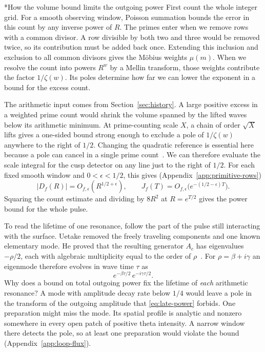 \documentclass[11pt,letterpaper]{article}
\makeatletter
\renewcommand\subsection{\@startsection{subsection}{2}{\z@}{-2.0ex plus -.3ex}{.75ex}{\normalfont\normalsize\itshape}}
\numberwithin{equation}{section}
\makeatother
\begin{document}
\subsection*{How the volume bound limits the outgoing power}
First count the whole integer grid. For a smooth observing window, Poisson summation bounds the error in this count by any inverse power of $R$. The primes enter when we remove rows with a common divisor. A row divisible by both two and three would be removed twice, so its contribution must be added back once. Extending this inclusion and exclusion to all common divisors gives the M\"obius weights $\mu(m)$. When we resolve the count into powers $R^w$ by a Mellin transform, those weights contribute the factor $1/\zeta(w)$. Its poles determine how far we can lower the exponent in a bound for the excess count.

The arithmetic input comes from Section~\ref{sec:history}. A large positive excess in a weighted prime count would shrink the volume spanned by the lifted waves below its arithmetic minimum. At prime-counting scale $X$, a chain of order $\sqrt X$ lifts gives a one-sided bound strong enough to exclude a pole of $1/\zeta(w)$ anywhere to the right of $1/2$. Changing the quadratic reference is essential here because a pole can cancel in a single prime count~\cite{volumelean,twistlean}. We can therefore evaluate the scale integral for the cusp detector on any line just to the right of $1/2$. For each fixed smooth window and $0<\epsilon<1/2$, this gives (Appendix~\ref{app:primitive-rows})
\begin{equation}
 |D_f(R)|=O_{f,\epsilon}(R^{1/2+\epsilon}),\qquad
 J_f(T)=O_{f,\epsilon}\bigl(e^{-(1/2-\epsilon)T}\bigr).
 \label{eq:late-power}
\end{equation}
Squaring the count estimate and dividing by $8R^2$ at $R=e^{T/2}$ gives the power bound for the whole pulse.

To read the lifetime of one resonance, follow the part of the pulse still interacting with the surface. Uetake removed the freely traveling components and one known elementary mode. He proved that the resulting generator $A_c$ has eigenvalues $-\rho/2$, each with algebraic multiplicity equal to the order of $\rho$~\cite[Theorem~4.4]{uetake}. For $\rho=\beta+i\gamma$ an eigenmode therefore evolves in wave time $\tau$ as
\begin{equation}
                 e^{-\beta\tau/2}\,e^{-i\gamma\tau/2}.
 \label{eq:cusp-decay}
\end{equation}
Why does a bound on total outgoing power fix the lifetime of \emph{each} arithmetic resonance? A mode with amplitude decay rate below $1/4$ would leave a pole in the transform of the outgoing amplitude that \eqref{eq:late-power} forbids. One preparation might miss the mode. Its spatial profile is analytic and nonzero somewhere in every open patch of positive theta intensity. A narrow window there detects the pole, so at least one preparation would violate the bound (Appendix~\ref{app:loop-flux}).
\end{document}
